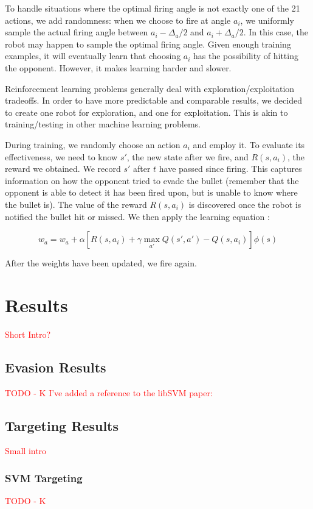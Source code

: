\documentclass{article}
\newcommand{\xxx}[1]{\textcolor{red}{#1}}
\theoremstyle{plain}
\theoremstyle{definition}
\theoremstyle{remark}
\begin{document}
To handle situations where the optimal firing angle is not exactly one of the 21 actions, we add randomness: when we choose to fire at angle $a_i$, we uniformly sample the actual
firing angle between $a_i - \Delta_a/2$ and $a_i + \Delta_a/2$. In this case, the robot may happen to sample the optimal firing angle. Given enough training examples, it will
eventually learn that choosing $a_i$ has the possibility of hitting the opponent. However, it makes learning harder and slower.

Reinforcement learning problems generally deal with exploration/exploitation tradeoffs. In order to have more predictable and comparable results, we decided to
create one robot for exploration, and one for exploitation. This is akin to training/testing in other machine learning problems.

During training, we randomly choose an action $a_i$ and employ it. To evaluate its effectiveness, we need to know $s'$, the new state after we fire,
and $R(s, a_i)$, the reward we obtained. We record $s'$ after $t$ have passed since firing. This captures information on
how the opponent tried to evade the bullet (remember that the opponent is able to detect it has been fired upon, but is unable to know where the bullet is).
The value of the reward $R(s, a_i)$ is discovered once the robot is notified the bullet hit or missed. We then apply the learning equation \cite{russelnorvig}:

$$w_a = w_a + \alpha\left[R(s, a_i) + \gamma\max_{a'}Q(s', a') - Q(s, a_i)\right]\phi(s)$$

After the weights have been updated, we fire again.\\

\section{Results}

\xxx{Short Intro?}

\subsection*{Evasion Results}
\xxx{TODO - K}
\xxx{I've added a reference to the libSVM paper: \cite{libsvm}}

\subsection*{Targeting Results}
\xxx{Small intro}

\subsubsection*{SVM Targeting}
\xxx{TODO - K}
\end{document}
